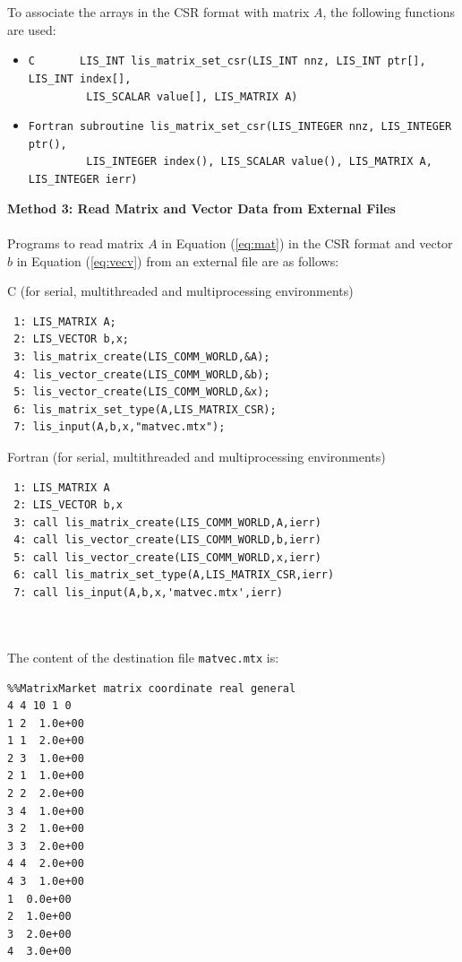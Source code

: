 \documentclass[a4paper]{article}
\begin{document}
To associate the arrays in the CSR format with matrix $A$, the following functions are used:
\begin{itemize}
\item \verb|C       LIS_INT lis_matrix_set_csr(LIS_INT nnz, LIS_INT ptr[], LIS_INT index[],|\\
      \verb|         LIS_SCALAR value[], LIS_MATRIX A)|
\item \verb|Fortran subroutine lis_matrix_set_csr(LIS_INTEGER nnz, LIS_INTEGER ptr(),|\\
      \verb|         LIS_INTEGER index(), LIS_SCALAR value(), LIS_MATRIX A, LIS_INTEGER ierr)|
\end{itemize}
\vspace*{5mm}

\noindent
{\bf Method 3: Read Matrix and Vector Data from External Files}\\
\\ \indent
Programs to read matrix $A$ in Equation (\ref{eq:mat}) in the CSR format and 
vector $b$ in Equation (\ref{eq:vecv}) from an external file are as follows: 
\\
\begin{itemsquarebox}[l]{C (for serial, multithreaded and multiprocessing environments)}
\small
\begin{verbatim}
 1: LIS_MATRIX A;
 2: LIS_VECTOR b,x;
 3: lis_matrix_create(LIS_COMM_WORLD,&A); 
 4: lis_vector_create(LIS_COMM_WORLD,&b); 
 5: lis_vector_create(LIS_COMM_WORLD,&x); 
 6: lis_matrix_set_type(A,LIS_MATRIX_CSR); 
 7: lis_input(A,b,x,"matvec.mtx"); 
\end{verbatim}
\end{itemsquarebox}
\begin{itemsquarebox}[l]{Fortran (for serial, multithreaded and multiprocessing environments)}
\small
\begin{verbatim}
 1: LIS_MATRIX A
 2: LIS_VECTOR b,x
 3: call lis_matrix_create(LIS_COMM_WORLD,A,ierr) 
 4: call lis_vector_create(LIS_COMM_WORLD,b,ierr) 
 5: call lis_vector_create(LIS_COMM_WORLD,x,ierr) 
 6: call lis_matrix_set_type(A,LIS_MATRIX_CSR,ierr) 
 7: call lis_input(A,b,x,'matvec.mtx',ierr) 
\end{verbatim}
\end{itemsquarebox}
\\ \\
The content of the destination file {\tt matvec.mtx} is:
{\small
\begin{verbatim}
%%MatrixMarket matrix coordinate real general
4 4 10 1 0
1 2  1.0e+00
1 1  2.0e+00
2 3  1.0e+00
2 1  1.0e+00
2 2  2.0e+00
3 4  1.0e+00
3 2  1.0e+00
3 3  2.0e+00
4 4  2.0e+00
4 3  1.0e+00
1  0.0e+00
2  1.0e+00
3  2.0e+00
4  3.0e+00
\end{verbatim}
}
\end{document}
